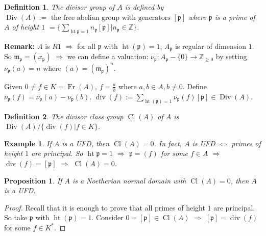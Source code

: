\documentclass[cs4size]{article}
\newcommand{\frm}{\mathfrak{m}}
\newcommand{\frp}{\mathfrak{p}}
\newcommand{\bb}{\mathbb}
\newcommand{\ra}{\rightarrow}
\newcommand{\Ra}{\Rightarrow}
\DeclareMathOperator{\Div}{Div}
\DeclareMathOperator{\divi}{div}
\DeclareMathOperator{\Fr}{Fr}
\DeclareMathOperator{\Cl}{Cl}
\DeclareMathOperator{\height}{ht}
\newtheorem{definition}{Definition}
\newtheorem{prop}{Proposition}
\newtheorem{ex}{Example}
\begin{document}
\begin{definition}
The divisor group of $A$ is defined by $\Div (A):= \text{ the free abelian group with generators } [\frp]$ where $\frp$ is a prime of $A$ of height $1$ $= \{\sum_{\height{\frp}=1}n_\frp[\frp]| n_\frp\in \bb{Z}\}$.
\end{definition}
\textbf{Remark:} $A$ is $R1$ $\Ra$ for all $\frp$ with $\height (\frp)=1$, $A_\frp$ is regular of dimension $1$. So $\frm_\frp=(x_\frp)$ $\Ra$ we can define a valuation: $\nu_\frp: A_\frp-\{0\}\ra \bb{Z}_{\geq 0}$ by setting $\nu_\frp(a)=n$ where $(a)=(\frm_\frp)^n$.

Given $0\neq f\in K=\Fr(A)$, $f=\frac{a}{b}$ where $a,b\in A,b\neq 0$. Define $\nu_\frp(f)=\nu_\frp(a)-\nu_\frp(b)$. $\divi(f):=\sum_{\height(\frp)=1}\nu_\frp(f)[\frp]\in \Div(A)$.
\begin{definition}
The divisor class group $\Cl(A)$ of $A$ is $\Div(A)/\{\divi(f)|f\in K\}$.
\end{definition}
\begin{ex}
If $A$ is a UFD, then $\Cl(A)=0$. In fact, $A$ is UFD $\Leftrightarrow$ primes of height $1$ are principal. So $\height{\frp}=1$ $\Ra$ $\frp=(f)$ for some $f\in A$ $\Ra$ $\divi(f)=[\frp]$ $\Ra$ $\Cl(A)=0$.
\end{ex}
\begin{prop}
If $A$ is a Noetherian normal domain with $\Cl(A)=0$, then $A$ is a UFD.
\end{prop}
\begin{proof}
Recall that it is enough to prove that all primes of height $1$ are principal. So take $\frp$ with $\height(\frp)=1$. Consider $0=[\frp]\in\Cl(A)$  $\Ra$ $[\frp]=\divi(f)$ for some $f\in K^*$.
\end{proof}
\end{document}
